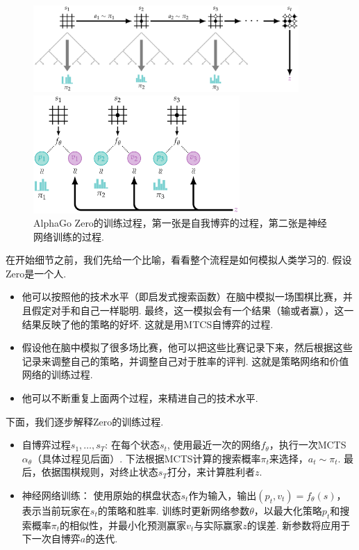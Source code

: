 \begin{figure}[ht]
\centering
\includegraphics[width=0.9\textwidth]{figures/game/self-play.pdf}
\vspace{1.5em}

\includegraphics[width=0.7\textwidth]{figures/game/network-training.pdf}
\caption{AlphaGo Zero的训练过程，第一张是自我博弈的过程，第二张是神经网络训练的过程. }
\label{fig:alphago-zero}
\end{figure}

在开始细节之前，我们先给一个比喻，看看整个流程是如何模拟人类学习的. 假设Zero是一个人. 
\begin{itemize}
    \item 他可以按照他的技术水平（即启发式搜索函数）在脑中模拟一场围棋比赛，并且假定对手和自己一样聪明. 最终，这一模拟会有一个结果（输或者赢），这一结果反映了他的策略的好坏. 这就是用MTCS自博弈的过程.
    \item 假设他在脑中模拟了很多场比赛，他可以把这些比赛记录下来，然后根据这些记录来调整自己的策略，并调整自己对于胜率的评判. 这就是策略网络和价值网络的训练过程.
    \item 他可以不断重复上面两个过程，来精进自己的技术水平. 
\end{itemize}

下面，我们逐步解释Zero的训练过程.

\begin{itemize}
    \item 自博弈过程$s_1,\dots,s_T$: 在每个状态$s_t$, 使用最近一次的网络$f_\theta$，执行一次MCTS $\alpha_\theta$（具体过程见后面）. 下法根据MCTS计算的搜索概率$\pi_t$来选择，$a_t\sim\pi_t$. 最后，依据围棋规则，对终止状态$s_T$打分，来计算胜利者$z$. 
    \item 神经网络训练： 使用原始的棋盘状态$s_t$作为输入，输出$(p_t,v_t)=f_\theta(s)$，表示当前玩家在$s_t$的策略和胜率. 训练时更新网络参数$\theta$，以最大化策略$p_t$和搜索概率$\pi_t$的相似性，并最小化预测赢家$v_t$与实际赢家$z$的误差. 新参数将应用于下一次自博弈$a$的迭代.     
\end{itemize}

